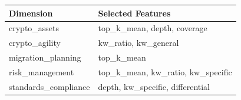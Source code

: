 \begin{tabular}{ll}
\toprule
Dimension & Selected Features \\
\midrule
crypto_assets & top_k_mean, depth, coverage \\
crypto_agility & kw_ratio, kw_general \\
migration_planning & top_k_mean \\
risk_management & top_k_mean, kw_ratio, kw_specific \\
standards_compliance & depth, kw_specific, differential \\
\bottomrule
\end{tabular}
